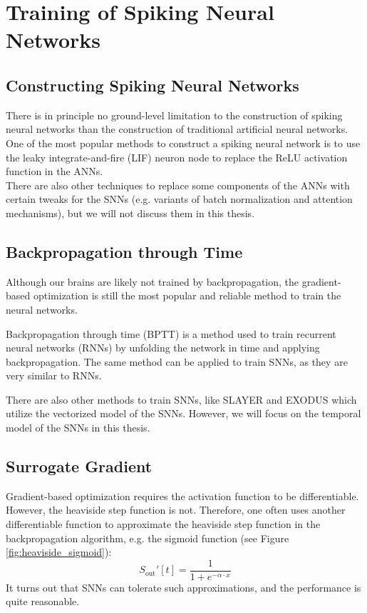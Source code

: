 \section{Training of Spiking Neural Networks}
\label{sec:snn_training}

    \subsection{Constructing Spiking Neural Networks}
    \label{subsec:snn_construct}
        There is in principle no ground-level limitation to the construction of spiking neural networks than the construction of traditional artificial neural networks. One of the most popular methods to construct a spiking neural network is to use the leaky integrate-and-fire (LIF) neuron node to replace the ReLU activation function in the ANNs. \\
        There are also other techniques to replace some components of the ANNs with certain tweaks for the SNNs (e.g. variants of batch normalization and attention mechanisms), but we will not discuss them in this thesis.

    \subsection{Backpropagation through Time}
    \label{subsec:snn_bptt}
        Although our brains are likely not trained by backpropagation, the gradient-based optimization is still the most popular and reliable method to train the neural networks. 

        Backpropagation through time (BPTT) is a method used to train recurrent neural networks (RNNs) by unfolding the network in time and applying backpropagation. The same method can be applied to train SNNs, as they are very similar to RNNs. 

        There are also other methods to train SNNs, like SLAYER \cite{Shrestha2018} and EXODUS \cite{bauer2022exodus} which utilize the vectorized model of the SNNs. However, we will focus on the temporal model of the SNNs in this thesis.

    \subsection{Surrogate Gradient}
    \label{subsec:lif_surrogate}
        Gradient-based optimization requires the activation function to be differentiable. However, the heaviside step function is not. Therefore, one often uses another differentiable function to approximate the heaviside step function in the backpropagation algorithm, e.g. the sigmoid function (see Figure \ref{fig:heaviside_sigmoid}): 
        \begin{equation}
            S_{\text{out}}'[t] = \frac{1}{1 + e^{-\alpha \cdot x}}
        \end{equation}
        It turns out that SNNs can tolerate such approximations, and the performance is quite reasonable. 
